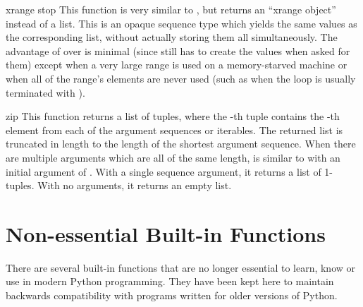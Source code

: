 \begin{funcdesc}{xrange}{ stop}
  This function is very similar to , but returns an
  ``xrange object'' instead of a list.  This is an opaque sequence
  type which yields the same values as the corresponding list, without
  actually storing them all simultaneously.  The advantage of
   over  is minimal (since
   still has to create the values when asked for
  them) except when a very large range is used on a memory-starved
  machine or when all of the range's elements are never used (such as
  when the loop is usually terminated with ).

\end{funcdesc}

\begin{funcdesc}{zip}{}
  This function returns a list of tuples, where the -th tuple contains
  the -th element from each of the argument sequences or iterables.
  The returned list is truncated in length to the length of
  the shortest argument sequence.  When there are multiple arguments
  which are all of the same length,  is
  similar to  with an initial argument of .
  With a single sequence argument, it returns a list of 1-tuples.
  With no arguments, it returns an empty list.

\end{funcdesc}




\section{Non-essential Built-in Functions \label{non-essential-built-in-funcs}}

There are several built-in functions that are no longer essential to learn,
know or use in modern Python programming.  They have been kept here to
maintain backwards compatibility with programs written for older versions
of Python.

